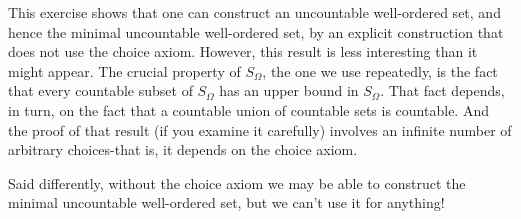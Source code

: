 \begin{enumerate}[itemsep=0.4em, parsep=0pt, topsep=0pt, partopsep=0pt, leftmargin=*, label=\arabic*., ref=\arabic*]
This exercise shows that one can construct an uncountable well-ordered set, 
and hence the minimal uncountable well-ordered set, by an explicit construction 
that does not use the choice axiom. However, this result is less interesting than it might appear. 
The crucial property of \(S_{\Omega }\), the one we use repeatedly, is the fact that every countable 
subset of \(S_{\Omega }\) has an upper bound in \(S_{\Omega }\). That fact depends, in turn, 
on the fact that a countable union of countable sets is countable. And the proof of that result 
(if you examine it carefully) involves an infinite number of arbitrary choices-that is, 
it depends on the choice axiom.

Said differently, without the choice axiom we may be able to construct the minimal 
uncountable well-ordered set, but we can't use it for anything!
\end{enumerate}